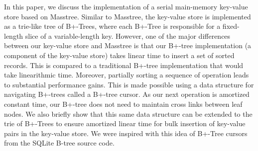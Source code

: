 In this paper, we discuss the implementation of a serial main-memory key-value store based on Masstree\cite{masstree}. Similar to Masstree, the key-value store is implemented as a trie-like tree of B+-Trees, where each B+-Tree is responsible for a fixed-length slice of a variable-length key. However, one of the major differences between our key-value store and Masstree is that our B+-tree implementation (a component of the key-value store) takes linear time to insert a set of sorted records. This is compared to a traditional B+-tree implementation that would take linearithmic time. Moreover, partially sorting a sequence of operation leads to substantial performance gains. This is made possible using a data structure for navigating B+-trees called a B+-tree cursor. As our next operation is amortized constant time, our B+-tree does not need to maintain cross links between leaf nodes. We also briefly show that this same data structure can be extended to the trie of B+-Trees to ensure amortized linear time for bulk insertion of key-value pairs in the key-value store. We were inspired with this idea of B+-Tree cursors from the SQLite \cite{SQLite} B-tree source code. 

\begin{comment}
    Confirm sqlite idea of cursors, is it constant time indeed?
    Show how cursor in b-tree and masstree impl. is indeed constant amortized time. is it really a cursor of cursors. 
    Update abstract in the end.
\end{comment}

